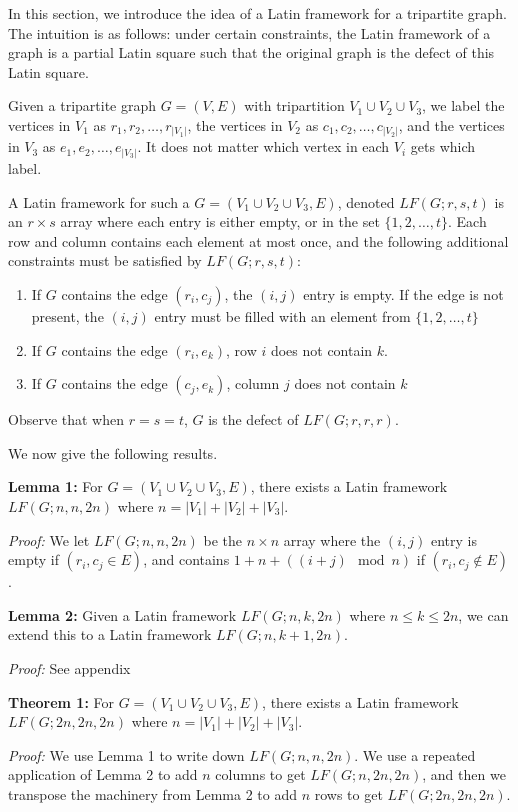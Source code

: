 \documentclass[11pt]{article}
\begin{document}
In this section, we introduce the idea of a Latin framework for a tripartite graph. The intuition is as follows: under certain constraints, the Latin framework of a graph is a partial Latin square such that the original graph is the defect of this Latin square.

Given a tripartite graph $G = (V,E)$ with tripartition $V_1 \cup V_2 \cup V_3$, we label the vertices in $V_1$ as $r_1,r_2,\dots,r_{|V_1|}$, the vertices in $V_2$ as $c_1,c_2,\dots,c_{|V_2|}$, and the vertices in $V_3$ as $e_1,e_2,\dots,e_{|V_3|}$. It does not matter which vertex in each $V_i$ gets which label.

A Latin framework for such a $G = (V_1 \cup V_2 \cup V_3,E)$, denoted $LF(G;r,s,t)$ is an $r \times s$ array where each entry is either empty, or in the set $\{1,2,\dots,t\}$. Each row and column contains each element at most once, and the following additional constraints must be satisfied by $LF(G;r,s,t)$:
\begin{enumerate}
\item If $G$ contains the edge $(r_i,c_j)$, the $(i,j)$ entry is empty. If the edge is not present, the $(i,j)$ entry must be filled with an element from $\{1,2,\dots,t\}$
\item If $G$ contains the edge $(r_i,e_k)$, row $i$ does not contain $k$.
\item If $G$ contains the edge $(c_j,e_k)$, column $j$ does not contain $k$
\end{enumerate}

Observe that when $r = s = t$, $G$ is the defect of $LF(G;r,r,r)$. 

We now give the following results.

\textbf{Lemma 1:} For $G = (V_1 \cup V_2 \cup V_3,E)$, there exists a Latin framework $LF(G;n,n,2n)$ where $n = |V_1| + |V_2| + |V_3|$.

\emph{Proof:} We let $LF(G;n,n,2n)$ be the $n \times n$ array where the $(i,j)$ entry is empty if $(r_i,c_j \in E)$, and contains $1 + n + ((i+j) \mod n)$ if $(r_i,c_j \not\in E)$.

\textbf{Lemma 2:} Given a Latin framework $LF(G;n,k,2n)$ where $n \leq k \leq 2n$, we can extend this to a Latin framework $LF(G;n,k+1,2n)$.

\emph{Proof:} See appendix

\textbf{Theorem 1:} For $G = (V_1 \cup V_2 \cup V_3,E)$, there exists a Latin framework $LF(G;2n,2n,2n)$ where $n = |V_1| + |V_2| + |V_3|$.

\emph{Proof:} We use Lemma 1 to write down $LF(G;n,n,2n)$. We use a repeated application of Lemma 2 to add $n$ columns to get $LF(G;n,2n,2n)$, and then we transpose the machinery from Lemma 2 to add $n$ rows to get $LF(G;2n,2n,2n)$.
\end{document}
